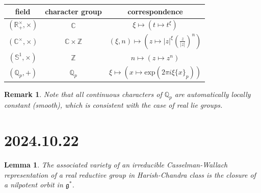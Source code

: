 \documentclass[12pt]{amsart}
\numberwithin{equation}{section}
\newtheorem{lem}[thm]{Lemma}
\newtheorem{rk}[thm]{Remark}
\newcommand{\BC}{{\mathbb {C}}}
\newcommand{\BQ}{{\mathbb {Q}}}
\newcommand{\BR}{{\mathbb {R}}}
\newcommand{\BS}{{\mathbb {S}}}
\newcommand{\BZ}{{\mathbb {Z}}}
\newcommand{\fg}{\mathfrak{g}}
\begin{document}
\begin{tabular}{|c|c|c|}
  \hline
  field            & character group & correspondence                                \\
  \hline
  $(\BR^\times_+,\times)$        & $\BC$           & $\xi \mapsto (t \mapsto t^\xi)$ \\
  \hline
  $(\BC^\times,\times) $ &    $\BC \times \BZ$             & $(\xi,n) \mapsto (z \mapsto |z|^\xi (\frac{z}{|z|})^n)$                                              \\
  \hline
  $(\BS^1,\times)$          &  $\BZ$               & $n \mapsto (z \mapsto z^n)$                                              \\
  \hline
  $(\BQ_p,+)$          & $\BQ_p$                 &  $\xi \mapsto (x \mapsto \mathrm{exp}(2\pi i \xi \{ x \}_p))$                                             \\
  \hline
\end{tabular}

\begin{rk}
  Note that all continuous characters of $\BQ_p$ are automatically locally constant (smooth), which is consistent with the case of real lie groups. 
\end{rk}

\newpage

\section{2024.10.22}

\begin{lem}
  The associated variety of an irreducible Casselman-Wallach representation of a real reductive group in Harish-Chandra class is the closure of a nilpotent orbit in $\fg^*$.
\end{lem}
\end{document}
